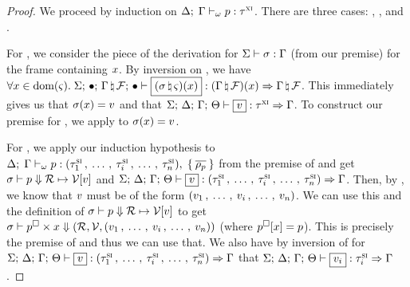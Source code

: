 \begin{proof} 
  We proceed by induction on
  $ \Delta; \; \Gamma \vdash_{\omega} p : \tau^\textsc{xi} $.
  There are three cases: , , and .

  \vspace{1em}
  \noindent \framebox[\textwidth]{
    \figuresize
    \begin{mathpar}
      \TCVar \and \PId
    \end{mathpar}
  }
  \vspace{1em}
  
  For , we consider the piece of the derivation for
  $\Sigma \vdash \sigma : \Gamma$ (from our premise)
  for the frame containing $x$. By inversion on ,
  we have $\forall \oxid \in \oxdomain{\oxstackframe}. \;
  \oxtypjudge{\oxglobalctx}{\oxemptyctx}{\oxemptyctx}{\oxnewframe{\oxvarctx}{\oxframe}}
  {(\oxnewframe{\oxstore}{\oxstackframe})(\oxid)}{
    (\oxnewframe{\oxvarctx}{\oxframe})(\oxid)
  }{\oxnewframe{\oxvarctx}{\oxframe}}$. This immediately gives us that
  $\sigma(x) = v$ and that
  $\oxtypjudge{\oxglobalctx}{\oxtvarctx}{\oxkontctx}{\oxvarctx}{\oxvalue}
  {\oxxitype}{\oxvarctx}$. To construct our premise for ,
  we apply  to $\sigma(x) = v$.

  \vspace{1em}
  \noindent \framebox[\textwidth]{
    \figuresize
    \begin{mathpar}
      \TCProj \and \PProj
    \end{mathpar}
  }
  \vspace{1em}
  
  For , we apply our induction hypothesis to
  $ \Delta; \; \Gamma \vdash_{\omega} 
    p
   : 
    (\tau^\textsc{si}_1 \, , \: \ldots \, , \: \tau^\textsc{si}_i \, , \: \ldots \, , \: \tau^\textsc{si}_n)
  , \; \{ \: \overline{\rho_p} \: \} $ from the premise of  and get
  $ \sigma \vdash p \Downarrow \mathcal{R} \mapsto \mathcal{V} [v] $ and
  $\oxtypjudge{\oxglobalctx}{\oxtvarctx}{\oxkontctx}{\oxvarctx}{\oxvalue}
  {\oxtprod{\oxsitype_1 \oxdotsc \oxsitype_i \oxdotsc \oxsitype_n}}{\oxvarctx}$.
  Then, by , we know that $v$ must be of the
  form $(v_1 \, , \: \ldots \, , \: v_i \, , \: \ldots \, , \: v_n)$. We can use
  this and the definition of $ \sigma \vdash p \Downarrow \mathcal{R} \mapsto \mathcal{V} [v] $ to get
  $ \sigma \vdash p^\square \times x \Downarrow (\mathcal{R}, \mathcal{V}, 
    (v_1 \, , \: \ldots \, , \: v_i \, , \: \ldots \, , \: v_n)
  ) $ (where $p^\square[x] = p$). This is precisely the
  premise of  and thus we can use that. We also have by inversion
  of  for
  $\oxtypjudge{\oxglobalctx}{\oxtvarctx}{\oxkontctx}{\oxvarctx}{\oxvalue}
  {\oxtprod{\oxsitype_1 \oxdotsc \oxsitype_i \oxdotsc \oxsitype_n}}{\oxvarctx}$
  that $\oxtypjudge{\oxglobalctx}{\oxtvarctx}{\oxkontctx}{\oxvarctx}{\oxvalue_i}
  {\oxsitype_i}{\oxvarctx}$.


\end{proof}
